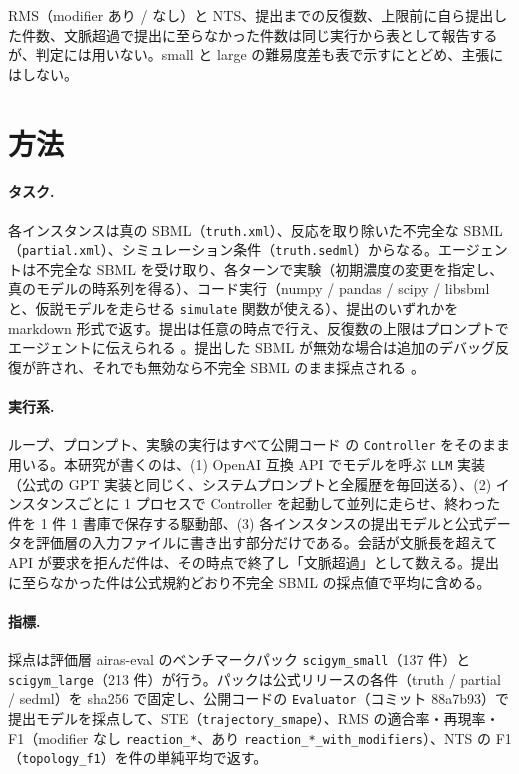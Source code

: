 \documentclass{article}
\begin{document}
RMS（modifier あり / なし）と NTS、提出までの反復数、上限前に自ら提出した件数、文脈超過で提出に至らなかった件数は同じ実行から表として報告するが、判定には用いない。small と large の難易度差も表で示すにとどめ、主張にはしない。

\section{方法}
\label{sec:method}
\paragraph{タスク.}
各インスタンスは真の SBML（\texttt{truth.xml}）、反応を取り除いた不完全な SBML（\texttt{partial.xml}）、シミュレーション条件（\texttt{truth.sedml}）からなる。エージェントは不完全な SBML を受け取り、各ターンで実験（初期濃度の変更を指定し、真のモデルの時系列を得る）、コード実行（numpy / pandas / scipy / libsbml と、仮説モデルを走らせる \texttt{simulate} 関数が使える）、提出のいずれかを markdown 形式で返す。提出は任意の時点で行え、反復数の上限はプロンプトでエージェントに伝えられる \cite[s1.p3]{duan-2025-measuring}。提出した SBML が無効な場合は追加のデバッグ反復が許され、それでも無効なら不完全 SBML のまま採点される \cite[s1.p4]{duan-2025-measuring}。

\paragraph{実行系.}
ループ、プロンプト、実験の実行はすべて公開コード \citep{h4duan-2025-scigym} の \texttt{Controller} をそのまま用いる。本研究が書くのは、(1) OpenAI 互換 API でモデルを呼ぶ \texttt{LLM} 実装（公式の GPT 実装と同じく、システムプロンプトと全履歴を毎回送る）、(2) インスタンスごとに 1 プロセスで Controller を起動して並列に走らせ、終わった件を 1 件 1 書庫で保存する駆動部、(3) 各インスタンスの提出モデルと公式データを評価層の入力ファイルに書き出す部分だけである。会話が文脈長を超えて API が要求を拒んだ件は、その時点で終了し「文脈超過」として数える。提出に至らなかった件は公式規約どおり不完全 SBML の採点値で平均に含める。

\paragraph{指標.}
採点は評価層 airas-eval のベンチマークパック \texttt{scigym\_small}（137 件）と \texttt{scigym\_large}（213 件）が行う。パックは公式リリースの各件（truth / partial / sedml）を sha256 で固定し、公開コードの \texttt{Evaluator}（コミット 88a7b93）で提出モデルを採点して、STE（\texttt{trajectory\_smape}）、RMS の適合率・再現率・F1（modifier なし \texttt{reaction\_*}、あり \texttt{reaction\_*\_with\_modifiers}）、NTS の F1（\texttt{topology\_f1}）を件の単純平均で返す。
\end{document}
